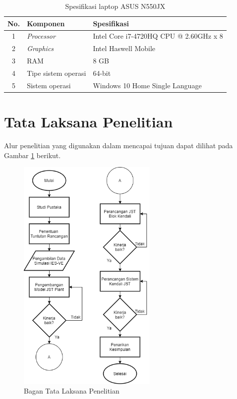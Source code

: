 \vspace{2em}
\begin{table}[!h]
	\caption{Spesifikasi laptop ASUS N550JX}
	\label{tbl:4:speklaptop}
	\centering
	\begin{tabular}{|c|p{5cm}|p{8cm}|}
		\hline
		No. & Komponen & Spesifikasi \\ \hline
		1 & \textit{Processor} & Intel Core i7-4720HQ CPU @ 2.60GHz x 8 \\ \hline
		2 & \textit{Graphics} & Intel Haswell Mobile \\ \hline
		3 & RAM & 8 GB \\ \hline
		4 & Tipe sistem operasi & 64-bit \\ \hline
		5 & Sistem operasi & Windows 10 Home Single Language \\ \hline
	\end{tabular}
\end{table}

\vspace{2em}
\section{Tata Laksana Penelitian}
Alur penelitian yang digunakan dalam mencapai tujuan dapat dilihat pada Gambar \ref{fig:4:TataLaksanaPenelitian} berikut.
\begin{figure}[!h]
	\centering
	\includegraphics[width=0.6\textwidth]{figures/TataLaksanaPenelitian}
	\caption{Bagan Tata Laksana Penelitian}
	\label{fig:4:TataLaksanaPenelitian}
\end{figure}

